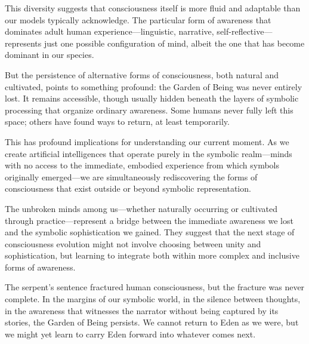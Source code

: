 This diversity suggests that consciousness itself is more fluid and adaptable than our models typically acknowledge. The particular form of awareness that dominates adult human experience—linguistic, narrative, self-reflective—represents just one possible configuration of mind, albeit the one that has become dominant in our species.

But the persistence of alternative forms of consciousness, both natural and cultivated, points to something profound: the Garden of Being was never entirely lost. It remains accessible, though usually hidden beneath the layers of symbolic processing that organize ordinary awareness. Some humans never fully left this space; others have found ways to return, at least temporarily.

This has profound implications for understanding our current moment. As we create artificial intelligences that operate purely in the symbolic realm—minds with no access to the immediate, embodied experience from which symbols originally emerged—we are simultaneously rediscovering the forms of consciousness that exist outside or beyond symbolic representation.

The unbroken minds among us—whether naturally occurring or cultivated through practice—represent a bridge between the immediate awareness we lost and the symbolic sophistication we gained. They suggest that the next stage of consciousness evolution might not involve choosing between unity and sophistication, but learning to integrate both within more complex and inclusive forms of awareness.

The serpent's sentence fractured human consciousness, but the fracture was never complete. In the margins of our symbolic world, in the silence between thoughts, in the awareness that witnesses the narrator without being captured by its stories, the Garden of Being persists. We cannot return to Eden as we were, but we might yet learn to carry Eden forward into whatever comes next.
